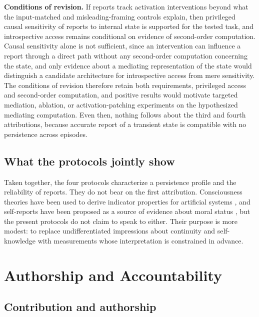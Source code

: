\documentclass[12pt]{article}
\theoremstyle{definition}
\theoremstyle{plain}
\begin{document}
\textbf{Conditions of revision.} If reports track activation interventions beyond what the input-matched and misleading-framing controls explain, then privileged causal sensitivity of reports to internal state is supported for the tested task, and introspective access remains conditional on evidence of second-order computation. Causal sensitivity alone is not sufficient, since an intervention can influence a report through a direct path without any second-order computation concerning the state, and only evidence about a mediating representation of the state would distinguish a candidate architecture for introspective access from mere sensitivity. The conditions of revision therefore retain both requirements, privileged access and second-order computation, and positive results would motivate targeted mediation, ablation, or activation-patching experiments on the hypothesized mediating computation. Even then, nothing follows about the third and fourth attributions, because accurate report of a transient state is compatible with no persistence across episodes.

\subsection{What the protocols jointly show}

Taken together, the four protocols characterize a persistence profile and the reliability of reports. They do not bear on the first attribution. Consciousness theories have been used to derive indicator properties for artificial systems \cite{butlin2023}, and self-reports have been proposed as a source of evidence about moral status \cite{perez2023}, but the present protocols do not claim to speak to either. Their purpose is more modest: to replace undifferentiated impressions about continuity and self-knowledge with measurements whose interpretation is constrained in advance.

\section{Authorship and Accountability}

\subsection{Contribution and authorship}
\end{document}
